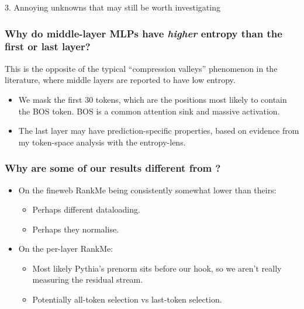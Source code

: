 \documentclass[11pt,a4paper]{article}
\begin{document}
\begin{weboptional}{3. Annoying unknowns that may still be worth investigating}
\subsubsection{Why do middle-layer MLPs have \emph{higher} entropy than the first or last layer?}

This is the opposite of the typical ``compression valleys'' phenomenon in the literature, where middle layers are reported to have low entropy.

\begin{itemize}
  \item We mask the first 30 tokens, which are the positions most likely to contain the BOS token. BOS is a common attention sink and massive activation.
  \item The last layer may have prediction-specific properties, based on evidence from my token-space analysis with the entropy-lens.
\end{itemize}

\subsubsection{Why are some of our results different from \texorpdfstring{\citet{li2025tracing}}{Li et al.\ (2025)}?}

\begin{itemize}
  \item On the fineweb RankMe being consistently somewhat lower than theirs:
    \begin{itemize}
      \item Perhaps different dataloading.
      \item Perhaps they normalise.
    \end{itemize}
  \item On the per-layer RankMe:
    \begin{itemize}
      \item Most likely Pythia's prenorm sits before our hook, so we aren't really measuring the residual stream.
      \item Potentially all-token selection vs last-token selection.
    \end{itemize}
\end{itemize}
\end{weboptional}






\end{document}
